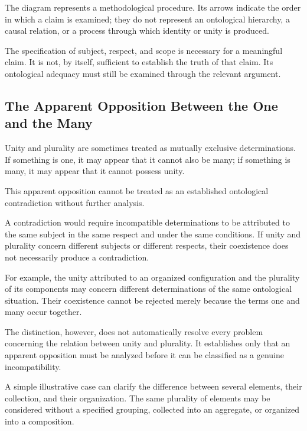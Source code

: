 

The diagram represents a methodological procedure.
Its arrows indicate the order in which a claim
is examined; they do not represent an ontological
hierarchy, a causal relation, or a process through
which identity or unity is produced.

The specification of subject, respect, and scope
is necessary for a meaningful claim. It is not,
by itself, sufficient to establish the truth
of that claim. Its ontological adequacy must
still be examined through the relevant argument.

\subsection{The Apparent Opposition Between the One and the Many}

Unity and plurality are sometimes treated as
mutually exclusive determinations. If something
is one, it may appear that it cannot also be many;
if something is many, it may appear that it cannot
possess unity.

This apparent opposition cannot be treated
as an established ontological contradiction
without further analysis.

A contradiction would require incompatible
determinations to be attributed to the same
subject in the same respect and under the
same conditions. If unity and plurality concern
different subjects or different respects,
their coexistence does not necessarily produce
a contradiction.

For example, the unity attributed to an organized
configuration and the plurality of its components
may concern different determinations of the
same ontological situation. Their coexistence
cannot be rejected merely because the terms
one and many occur together.

The distinction, however, does not automatically
resolve every problem concerning the relation
between unity and plurality. It establishes
only that an apparent opposition must be
analyzed before it can be classified as a
genuine incompatibility.

A simple illustrative case can clarify the
difference between several elements, their
collection, and their organization. The same
plurality of elements may be considered without
a specified grouping, collected into an aggregate,
or organized into a composition.



